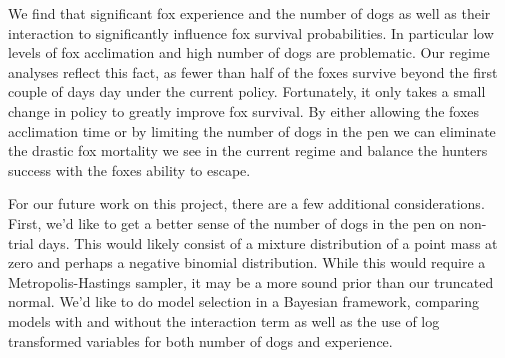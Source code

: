 \documentclass[aoas,preprint]{imsart}
\numberwithin{equation}{section}
\theoremstyle{plain}
\begin{document}
We find that significant fox experience and the number of dogs as well as their interaction to significantly influence fox survival probabilities. In particular low levels of fox acclimation and high number of dogs are problematic. Our regime analyses reflect this fact, as fewer than half of the foxes survive beyond the first couple of days day under the current policy. Fortunately, it only takes a small change in policy to greatly improve fox survival. By either allowing the foxes acclimation time or by limiting the number of dogs in the pen we can eliminate the drastic fox mortality we see in the current regime and balance the hunters success with the foxes ability to escape.

For our future work on this project, there are a few additional considerations. First, we'd like to get a better sense of the number of dogs in the pen on non-trial days. This would likely consist of a mixture distribution of a point mass at zero and perhaps a negative binomial distribution. While this would require a Metropolis-Hastings sampler, it may be a more sound prior than our truncated normal. We'd like to do model selection in a Bayesian framework, comparing models with and without the interaction term as well as the use of log transformed variables for both number of dogs and experience.


\end{document}
